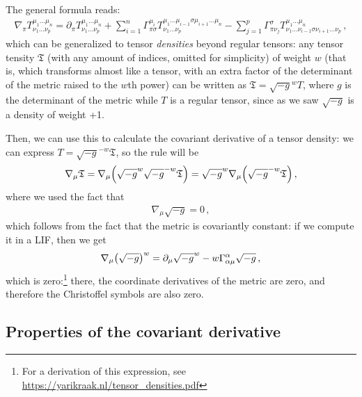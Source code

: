 \documentclass[main.tex]{subfiles}
\begin{document}
\begin{bluebox}
  

The general formula reads: 
%
\begin{align}
\nabla_{\pi } T^{\mu_1 \dots \mu_{n}}_{\nu_1 \dots \nu_{p}} =
\partial_{\pi } T^{\mu_1 \dots \mu_{n}}_{\nu_1 \dots \nu_{p}}
+ \sum_{i=1}^{n} \Gamma^{\mu_{i}}_{\pi \sigma }
T^{\mu_1 \dots \mu_{i-1} \sigma \mu_{i+1} \dots \mu_{n}}_{\nu_1 \dots \nu_{p}}
- \sum _{j=1}^{p} \Gamma^{\sigma }_{\pi \nu_j}
T^{\mu_1 \dots \mu_{n}}_{\nu_1 \dots \nu_{i-1} \sigma \nu_{i+1} \dots \nu_{p}}
\,,
\end{align}
%
which can be generalized to tensor \emph{densities} beyond regular tensors: any tensor tensity \(\mathfrak{T}\) (with any amount of indices, omitted for simplicity) of weight \(w\) (that is, which transforms almost like a tensor, with an extra factor of the determinant of the metric raised to the \(w\)th power) can be written as \(\mathfrak{T} = \sqrt{-g}^{w} T\), where \(g\) is the determinant of the metric while \(T\) is a regular tensor, since as we saw \(\sqrt{-g}\) is a density of weight +1.

Then, we can use this to calculate the covariant derivative of a tensor density: we can express \(T = \sqrt{-g}^{-w} \mathfrak{T}\), so the rule will be 
%
\begin{align}
\nabla_{\mu } \mathfrak{T} = \nabla_{\mu } \qty(\sqrt{-g}^{w} \sqrt{-g}^{-w} \mathfrak{T})
= \sqrt{-g}^{w} \nabla_{\mu } \qty(\sqrt{-g}^{-w} \mathfrak{T})
\,,
\end{align}
%
where we used the fact that 
%
\begin{align}
\nabla_{\mu} \sqrt{-g} = 0
\,,
\end{align}
%
which follows from the fact that the metric is covariantly constant: if we compute it in a LIF, then we get 
%
\begin{align}
\nabla_{ \mu} \qty(\sqrt{-g})^{w} = \partial_{\mu } \sqrt{-g}^{w}
- w \Gamma^{\alpha }_{\alpha \mu} \sqrt{-g} 
\,,
\end{align}
%
which is zero:\footnote{For a derivation of this expression, see \url{https://yarikraak.nl/tensor_densities.pdf}} there, the coordinate derivatives of the metric are zero, and therefore the Christoffel symbols are also zero. 
\end{bluebox}


\subsection{Properties of the covariant derivative}
\end{document}
